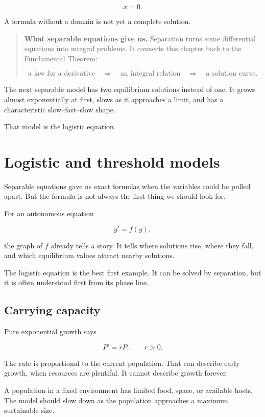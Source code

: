 \[
x=0.
\]

A formula without a domain is not yet a complete solution.

\begin{quote}
\textbf{What separable equations give us.}
Separation turns some differential equations into integral problems.  It connects this
chapter back to the Fundamental Theorem:

\[
\text{a law for a derivative}
\quad\Longrightarrow\quad
\text{an integral relation}
\quad\Longrightarrow\quad
\text{a solution curve}.
\]
\end{quote}

The next separable model has two equilibrium solutions instead of one.  It grows almost
exponentially at first, slows as it approaches a limit, and has a characteristic
slow--fast--slow shape.

That model is the logistic equation.
\section{Logistic and threshold models}
\label{sec:logistic-threshold-models}

Separable equations gave us exact formulas when the variables could be pulled apart.
But the formula is not always the first thing we should look for.

For an autonomous equation

\[
y'=f(y),
\]

the graph of \(f\) already tells a story.  It tells where solutions rise, where they fall,
and which equilibrium values attract nearby solutions.

The logistic equation is the best first example.  It can be solved by separation, but it is
often understood first from its phase line.

\subsection{Carrying capacity}
\label{subsec:carrying-capacity}

Pure exponential growth says

\[
P'=rP,
\qquad r>0.
\]

The rate is proportional to the current population.  That can describe early growth, when
resources are plentiful.  It cannot describe growth forever.

A population in a fixed environment has limited food, space, or available hosts.  The
model should slow down as the population approaches a maximum sustainable size.

